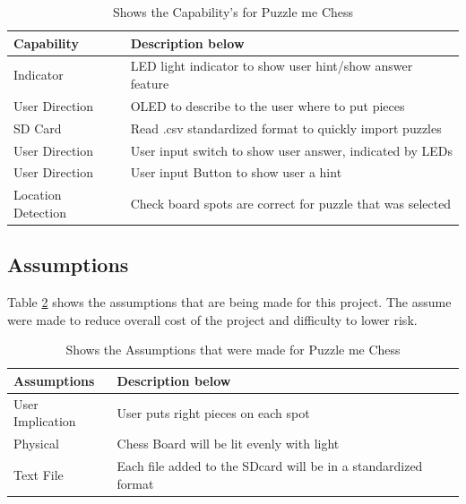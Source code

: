 \documentclass[11pt]{article}
\begin{document}
\begin{table}
\begin{center}
    \begin{tabular}{| l | l |}
    \hline
    Capability  & Description below\\ \hline
    Indicator &  LED light indicator to show user hint/show answer feature \\ \hline
    User Direction & OLED to describe to the user where to put pieces \\ \hline 
    SD Card & Read .csv standardized format to quickly import puzzles \\ \hline
    User Direction & User input switch to show user answer, indicated by LEDs \\ \hline
    User Direction & User input Button to show user a hint \\ \hline
    Location Detection & Check board spots are correct for puzzle that was selected \\ \hline
    \end{tabular}
    \caption{Shows the Capability's for Puzzle me Chess}
	\label{tab:capability}
\end{center}
\end{table}

\subsection{Assumptions}
Table \ref{tab:Assumptions} shows the assumptions that are being made for this project. The assume were made to reduce overall cost of the project and difficulty to lower risk. 

\begin{table}
\begin{center}
    \begin{tabular}{| l | l |}
    \hline
    Assumptions & Description below\\ \hline
    User Implication  & User puts right pieces on each spot \\ \hline
    Physical &  Chess Board will be lit evenly with light  \\ \hline
    Text File & Each file added to the SDcard will be in a standardized format \\ \hline     
    \end{tabular}
    \caption{Shows the Assumptions that were made for Puzzle me Chess}
	\label{tab:Assumptions}
\end{center}
\end{table}
\end{document}
